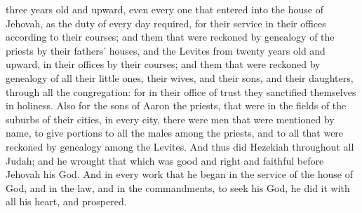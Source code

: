 three years old and upward, even every one that entered into the house of Jehovah, as the duty of every day required, for their service in their offices according to their courses; and them that were reckoned by genealogy of the priests by their fathers’ houses, and the Levites from twenty years old and upward, in their offices by their courses; and them that were reckoned by genealogy of all their little ones, their wives, and their sons, and their daughters, through all the congregation: for in their office of trust they sanctified themselves in holiness. Also for the sons of Aaron the priests, that were in the fields of the suburbs of their cities, in every city, there were men that were mentioned by name, to give portions to all the males among the priests, and to all that were reckoned by genealogy among the Levites.  And thus did Hezekiah throughout all Judah; and he wrought that which was good and right and faithful before Jehovah his God. And in every work that he began in the service of the house of God, and in the law, and in the commandments, to seek his God, he did it with all his heart, and prospered. 


